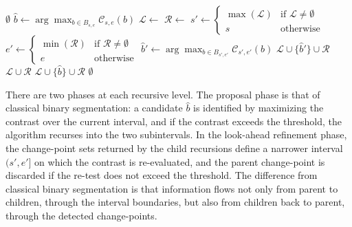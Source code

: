 \documentclass[12pt, a4paper]{article}
\begin{document}
\begin{algorithm}[H]
{\scriptsize
\caption{Look-Ahead Binary Segmentation (LABS)}
\label{alg:labs}
\begin{algorithmic}[1]
        \State \Return $\emptyset$
    \EndIf
    \State $\hat{b} \gets \arg\max_{b \in B_{s,e}} \mathcal{C}_{s,e}(b)$
     
        \State $\mathcal{L} \gets$  \Comment{Recurse on $(s, \hat{b}]$}
        \State $\mathcal{R} \gets$  \Comment{Recurse on $(\hat{b}, e]$}
        \State {}
            \State $s' \gets \begin{cases} \max(\mathcal{L}) & \text{if } \mathcal{L} \neq \emptyset \\ s & \text{otherwise} \end{cases}$
            \State $e' \gets \begin{cases} \min(\mathcal{R}) & \text{if } \mathcal{R} \neq \emptyset \\ e & \text{otherwise} \end{cases}$
                \State $\hat{b}' \gets \arg\max_{b \in B_{s',e'}} \mathcal{C}_{s',e'}(b)$ \Comment{Re-test on $(s', e']$}
                    \State \Return $\mathcal{L} \cup \{\hat{b}'\} \cup \mathcal{R}$ 
                \EndIf
            \EndIf
            \State \Return $\mathcal{L} \cup \mathcal{R}$ 
        \EndIf
        \State \Return $\mathcal{L} \cup \{\hat{b}\} \cup \mathcal{R}$ 
    \Else
        \State \Return $\emptyset$
    \EndIf
\EndFunction
\end{algorithmic}
}
\end{algorithm}

There are two phases at each recursive level. The proposal phase is that of classical binary segmentation: a candidate $\hat{b}$ is identified by maximizing the contrast over the current interval, and if the contrast exceeds the threshold, the algorithm recurses into the two subintervals. In the look-ahead refinement phase, the change-point sets returned by the child recursions define a narrower interval $(s', e']$ on which the contrast is re-evaluated, and the parent change-point is discarded if the re-test does not exceed the threshold. The difference from classical binary segmentation is that information flows not only from parent to children, through the interval boundaries, but also from children back to parent, through the detected change-points.
\end{document}
